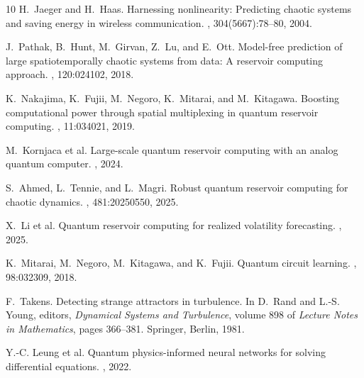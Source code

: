 \documentclass[11pt,a4paper]{article}
\begin{document}
\begin{thebibliography}{10}
H.~Jaeger and H.~Haas.
\newblock Harnessing nonlinearity: Predicting chaotic systems and saving energy in wireless communication.
, 304(5667):78--80, 2004.

J.~Pathak, B.~Hunt, M.~Girvan, Z.~Lu, and E.~Ott.
\newblock Model-free prediction of large spatiotemporally chaotic systems from data: A reservoir computing approach.
, 120:024102, 2018.

K.~Nakajima, K.~Fujii, M.~Negoro, K.~Mitarai, and M.~Kitagawa.
\newblock Boosting computational power through spatial multiplexing in quantum reservoir computing.
, 11:034021, 2019.

M.~Kornjaca et al.
\newblock Large-scale quantum reservoir computing with an analog quantum computer.
, 2024.

S.~Ahmed, L.~Tennie, and L.~Magri.
\newblock Robust quantum reservoir computing for chaotic dynamics.
, 481:20250550, 2025.

X.~Li et al.
\newblock Quantum reservoir computing for realized volatility forecasting.
, 2025.

K.~Mitarai, M.~Negoro, M.~Kitagawa, and K.~Fujii.
\newblock Quantum circuit learning.
, 98:032309, 2018.

F.~Takens.
\newblock Detecting strange attractors in turbulence.
\newblock In D.~Rand and L.-S. Young, editors, {\em Dynamical Systems and Turbulence}, volume 898 of {\em Lecture Notes in Mathematics}, pages 366--381. Springer, Berlin, 1981.

Y.-C. Leung et al.
\newblock Quantum physics-informed neural networks for solving differential equations.
, 2022.

\end{thebibliography}
\end{document}
